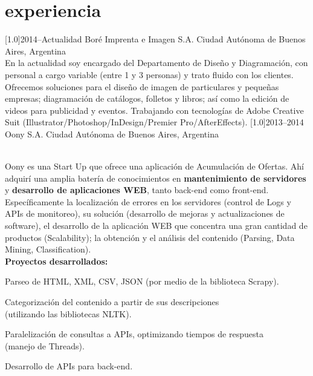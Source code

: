 \documentclass[espanol]{cv-style}     %
\begin{document}
	\section{experiencia}
	\vspace{-0.2cm}
	\begin{entrylist}
		\entry
		{\scalebox{.8}[1.0]{2014--Actualidad}}
		{Boré Imprenta e Imagen S.A.}
		{Ciudad Autónoma de Buenos Aires, Argentina}
		{\\
			En la actualidad soy encargado del Departamento de Diseño y Diagramación, con personal a cargo variable (entre 1 y 3 personas) y trato fluido con los clientes. Ofrecemos soluciones para el diseño de imagen de particulares y pequeñas empresas; diagramación de catálogos, folletos y libros; así como la edición de videos para publicidad y eventos. Trabajando con tecnologías de Adobe Creative Suit (Illustrator/Photoshop/InDesign/Premier Pro/AfterEffects).}
		\vspace{-0.3cm}
		\entry
		{\scalebox{.8}[1.0]{2013--2014}}
		{Oony S.A.}
		{Ciudad Autónoma de Buenos Aires, Argentina}
		{\\
			Oony es una Start Up que ofrece una aplicación de Acumulación de Ofertas. Ahí adquirí una amplia batería de conocimientos en \textbf{mantenimiento de servidores} y \textbf{desarrollo de aplicaciones WEB}, tanto back-end como front-end. Específicamente la localización de errores en los servidores (control de Logs y APIs de monitoreo), su solución (desarrollo de mejoras y actualizaciones de software), el desarrollo de la aplicación WEB que concentra una gran cantidad de productos (Scalability); la obtención y el análisis del contenido (Parsing, Data Mining, Classification).\\
			\textbf{Proyectos desarrollados:}
			\begin{itemize}\small{
					\item Parseo de HTML, XML, CSV, JSON (por medio de la biblioteca Scrapy).
					\item Categorización del contenido a partir de sus descripciones\\
					(utilizando las bibliotecas NLTK).
					\item Paralelización de consultas a APIs, optimizando tiempos de respuesta\\
					(manejo de Threads).
					\item Desarrollo de APIs para back-end.}
		\end{itemize}}
	\end{entrylist}
\end{document}
